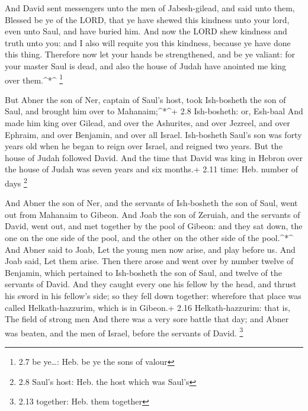  And David sent messengers unto the men of Jabesh-gilead,
and said unto them, Blessed be ye of the LORD, that ye have shewed this
kindness unto your lord, even unto Saul, and have buried him.
 And now the LORD shew kindness and truth unto you: and I
also will requite you this kindness, because ye have done this thing.
 Therefore now let your hands be strengthened, and be ye
valiant: for your master Saul is dead, and also the house of Judah have
anointed me king over them.\^{}*\^{} \footnote{2.7 be ye\ldots: Heb. be
  ye the sons of valour}

 But Abner the son of Ner, captain of Saul's host, took
Ish-bosheth the son of Saul, and brought him over to Mahanaim;\^{}*\^{}+
2.8 Ish-bosheth: or, Esh-baal  And made him king over
Gilead, and over the Ashurites, and over Jezreel, and over Ephraim, and
over Benjamin, and over all Israel.  Ish-bosheth Saul's son
was forty years old when he began to reign over Israel, and reigned two
years. But the house of Judah followed David.  And the time
that David was king in Hebron over the house of Judah was seven years
and six months.+ 2.11 time: Heb. number of days \footnote{2.8 Saul's
  host: Heb. the host which was Saul's}

 And Abner the son of Ner, and the servants of Ish-bosheth
the son of Saul, went out from Mahanaim to Gibeon.  And
Joab the son of Zeruiah, and the servants of David, went out, and met
together by the pool of Gibeon: and they sat down, the one on the one
side of the pool, and the other on the other side of the pool.\^{}*\^{}
 And Abner said to Joab, Let the young men now arise, and
play before us. And Joab said, Let them arise.  Then there
arose and went over by number twelve of Benjamin, which pertained to
Ish-bosheth the son of Saul, and twelve of the servants of David.
 And they caught every one his fellow by the head, and
thrust his sword in his fellow's side; so they fell down together:
wherefore that place was called Helkath-hazzurim, which is in Gibeon.+
2.16 Helkath-hazzurim: that is, The field of strong men 
And there was a very sore battle that day; and Abner was beaten, and the
men of Israel, before the servants of David. \footnote{2.13 together:
  Heb. them together}

